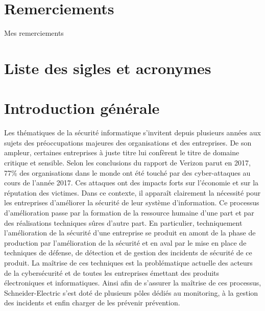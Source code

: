 \documentclass[a4paper,12pt]{book}
\makeatletter
\def\cleardoublepage{\clearpage\if@twoside \ifodd\c@page\else%
  \hbox{}%
  \thispagestyle{empty}%
  \newpage%
  \if@twocolumn\hbox{}\newpage\fi\fi\fi}
\theoremstyle{break}
\makeatother
\begin{document}

\frontmatter

\chapter*{Remerciements}
Mes remerciements 

\clearpage
\tableofcontents

\clearpage
\listoffigures

\clearpage
\chapter*{Liste des sigles et acronymes}
\begin{acronym}[CP-OFDMX] %
\end{acronym}


\mainmatter
\pagestyle{fancy}

\cleardoublepage

\chapter*{Introduction générale}
\vspace*{-1.1cm}
Les thématiques de la sécurité informatique s’invitent depuis plusieurs années aux sujets des préoccupations majeures des organisations et des entreprises. 
De son ampleur, certaines entreprises à juste titre lui confèrent le titre de domaine critique et sensible. 
Selon les conclusions du rapport de Verizon parut en 2017, 77\% des organisations dans le monde ont été touché par des cyber-attaques au cours de l’année 2017. \newline
Ces attaques ont des impacts forts sur l’économie et sur la réputation des victimes. Dans ce contexte, il apparaît clairement la nécessité pour les entreprises d’améliorer la sécurité de leur système d’information.
Ce processus d’amélioration passe par la formation de la ressource humaine d’une part et par des réalisations techniques sûres d’autre part. \newline
En particulier, techniquement l’amélioration de la sécurité d’une entreprise se produit en amont de la phase de production par l’amélioration de la sécurité et en aval par le mise en place de techniques de défense, de détection et de gestion des incidents de sécurité de ce produit.\newline
La maîtrise de ces techniques est la problématique actuelle des acteurs de la cybersécurité et de toutes les entreprises émettant des produits électroniques et informatiques. 
Ainsi afin de s’assurer la maîtrise de ces processus, Schneider-Electric s'est doté de plusieurs pôles dédiés au monitoring, à la gestion des incidents et enfin charger de les prévenir prévention. 
\end{document}
